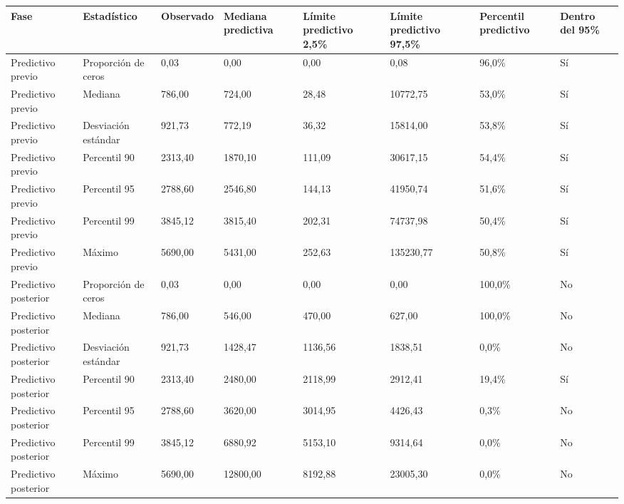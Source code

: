 \begin{tabular}{llllllll}
\toprule
Fase & Estadístico & Observado & Mediana predictiva & Límite predictivo 2,5\% & Límite predictivo 97,5\% & Percentil predictivo & Dentro del 95\% \\
\midrule
Predictivo previo & Proporción de ceros & 0,03 & 0,00 & 0,00 & 0,08 & 96,0\% & Sí \\
Predictivo previo & Mediana & 786,00 & 724,00 & 28,48 & 10772,75 & 53,0\% & Sí \\
Predictivo previo & Desviación estándar & 921,73 & 772,19 & 36,32 & 15814,00 & 53,8\% & Sí \\
Predictivo previo & Percentil 90 & 2313,40 & 1870,10 & 111,09 & 30617,15 & 54,4\% & Sí \\
Predictivo previo & Percentil 95 & 2788,60 & 2546,80 & 144,13 & 41950,74 & 51,6\% & Sí \\
Predictivo previo & Percentil 99 & 3845,12 & 3815,40 & 202,31 & 74737,98 & 50,4\% & Sí \\
Predictivo previo & Máximo & 5690,00 & 5431,00 & 252,63 & 135230,77 & 50,8\% & Sí \\
Predictivo posterior & Proporción de ceros & 0,03 & 0,00 & 0,00 & 0,00 & 100,0\% & No \\
Predictivo posterior & Mediana & 786,00 & 546,00 & 470,00 & 627,00 & 100,0\% & No \\
Predictivo posterior & Desviación estándar & 921,73 & 1428,47 & 1136,56 & 1838,51 & 0,0\% & No \\
Predictivo posterior & Percentil 90 & 2313,40 & 2480,00 & 2118,99 & 2912,41 & 19,4\% & Sí \\
Predictivo posterior & Percentil 95 & 2788,60 & 3620,00 & 3014,95 & 4426,43 & 0,3\% & No \\
Predictivo posterior & Percentil 99 & 3845,12 & 6880,92 & 5153,10 & 9314,64 & 0,0\% & No \\
Predictivo posterior & Máximo & 5690,00 & 12800,00 & 8192,88 & 23005,30 & 0,0\% & No \\
\bottomrule
\end{tabular}
